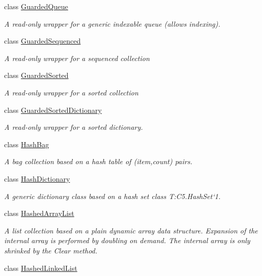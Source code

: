 \begin{DoxyCompactItemize}
class \hyperlink{class_c5_1_1_guarded_queue}{Guarded\+Queue}
\begin{DoxyCompactList}\small\item\em A read-\/only wrapper for a generic indexable queue (allows indexing). \end{DoxyCompactList}\item 
class \hyperlink{class_c5_1_1_guarded_sequenced}{Guarded\+Sequenced}
\begin{DoxyCompactList}\small\item\em A read-\/only wrapper for a sequenced collection \end{DoxyCompactList}\item 
class \hyperlink{class_c5_1_1_guarded_sorted}{Guarded\+Sorted}
\begin{DoxyCompactList}\small\item\em A read-\/only wrapper for a sorted collection \end{DoxyCompactList}\item 
class \hyperlink{class_c5_1_1_guarded_sorted_dictionary}{Guarded\+Sorted\+Dictionary}
\begin{DoxyCompactList}\small\item\em A read-\/only wrapper for a sorted dictionary. \end{DoxyCompactList}\item 
class \hyperlink{class_c5_1_1_hash_bag}{Hash\+Bag}
\begin{DoxyCompactList}\small\item\em A bag collection based on a hash table of (item,count) pairs. \end{DoxyCompactList}\item 
class \hyperlink{class_c5_1_1_hash_dictionary}{Hash\+Dictionary}
\begin{DoxyCompactList}\small\item\em A generic dictionary class based on a hash set class T\+:\+C5.\+Hash\+Set`1. \end{DoxyCompactList}\item 
class \hyperlink{class_c5_1_1_hashed_array_list}{Hashed\+Array\+List}
\begin{DoxyCompactList}\small\item\em A list collection based on a plain dynamic array data structure. Expansion of the internal array is performed by doubling on demand. The internal array is only shrinked by the Clear method. \end{DoxyCompactList}\item 
class \hyperlink{class_c5_1_1_hashed_linked_list}{Hashed\+Linked\+List}

\end{DoxyCompactItemize}
